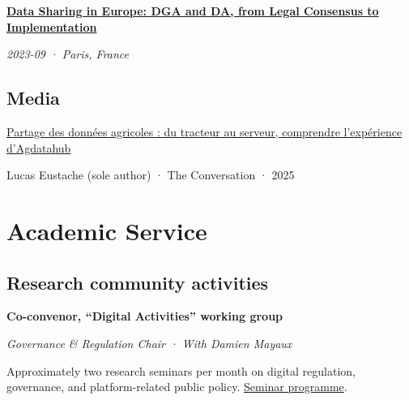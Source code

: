 \documentclass[11pt,a4paper]{article}
\newlength{\cvindent}
\let\cvoldsection\section
\renewcommand{\section}[1]{\Needspace{5\baselineskip}\cvoldsection{#1}}
\newenvironment{cvblock}[1][1]{%
  \par\noindent\hspace*{#1\cvindent}%
  \begin{minipage}{\dimexpr\linewidth-#1\cvindent\relax}%
}{%
  \end{minipage}\par
}
\newenvironment{cvdetails}{%
  \begin{list}{}{%
    \setlength{\leftmargin}{\cvindent}%
    \setlength{\rightmargin}{0pt}%
    \setlength{\topsep}{0.1em}%
    \setlength{\partopsep}{0pt}%
    \setlength{\parsep}{0.05em}%
    \setlength{\itemsep}{0pt}%
  }\item[]\small\ignorespaces
}{%
  \end{list}
}
\begin{document}
\begin{cvblock}[2]
\textbf{\href{https://chairgovreg.fondation-dauphine.fr/en/publication/1655/synthese-data-sharing-europe-dga-and-da-legal-consensus-achievement-implementation}{Data Sharing in Europe: DGA and DA, from Legal Consensus to Implementation}}\par
\begin{cvdetails}
{\small\itshape 2023-09 · Paris, France}\par
\end{cvdetails}
\end{cvblock}\par\vspace{0.35em}

\subsection*{Media}
\begin{cvblock}[2]
\href{https://theconversation.com/partage-des-donnees-agricoles-du-tracteur-au-serveur-comprendre-lexperience-dagdatahub-256597}{Partage des données agricoles : du tracteur au serveur, comprendre l'expérience d'Agdatahub}\par
\begin{cvdetails}
{\small Lucas Eustache (sole author) · The Conversation · 2025}\par
\end{cvdetails}
\end{cvblock}\par\vspace{0.35em}

\section{Academic Service}
\subsection*{Research community activities}
\begin{cvblock}[2]
\textbf{Co-convenor, ``Digital Activities'' working group}\par
\begin{cvdetails}
{\small\itshape Governance \& Regulation Chair · With Damien Mayaux}\par
Approximately two research seminars per month on digital regulation, governance, and platform-related public policy.
\href{https://acss-dig.psl.eu/fr/seminaires/digital-regulation}{Seminar programme}.
\end{cvdetails}
\end{cvblock}\par\vspace{0.35em}
\end{document}
